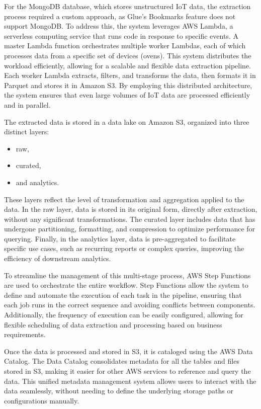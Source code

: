 For the MongoDB database, which stores unstructured IoT data, the extraction process required a custom approach, as Glue's Bookmarks feature does not support MongoDB. To address this, the system leverages \ac{AWS} Lambda, a serverless computing service that runs code in response to specific events. A master Lambda function orchestrates multiple worker Lambdas, each of which processes data from a specific set of devices (ovens). This system distributes the workload efficiently, allowing for a scalable and flexible data extraction pipeline. Each worker Lambda extracts, filters, and transforms the data, then formats it in Parquet and stores it in Amazon S3. By employing this distributed architecture, the system ensures that even large volumes of IoT data are processed efficiently and in parallel.

The extracted data is stored in a data lake on Amazon S3, organized into three distinct layers:
\begin{itemize}
    \item raw,
    \item curated,
    \item and analytics.
\end{itemize}
These layers reflect the level of transformation and aggregation applied to the data. In the raw layer, data is stored in its original form, directly after extraction, without any significant transformations. The curated layer includes data that has undergone partitioning, formatting, and compression to optimize performance for querying. Finally, in the analytics layer, data is pre-aggregated to facilitate specific use cases, such as recurring reports or complex queries, improving the efficiency of downstream analytics.

To streamline the management of this multi-stage process, \ac{AWS} Step Functions are used to orchestrate the entire workflow. Step Functions allow the system to define and automate the execution of each task in the pipeline, ensuring that each job runs in the correct sequence and avoiding conflicts between components. Additionally, the frequency of execution can be easily configured, allowing for flexible scheduling of data extraction and processing based on business requirements.

Once the data is processed and stored in S3, it is cataloged using the \ac{AWS} Data Catalog. The Data Catalog consolidates metadata for all the tables and files stored in S3, making it easier for other \ac{AWS} services to reference and query the data. This unified metadata management system allows users to interact with the data seamlessly, without needing to define the underlying storage paths or configurations manually.

